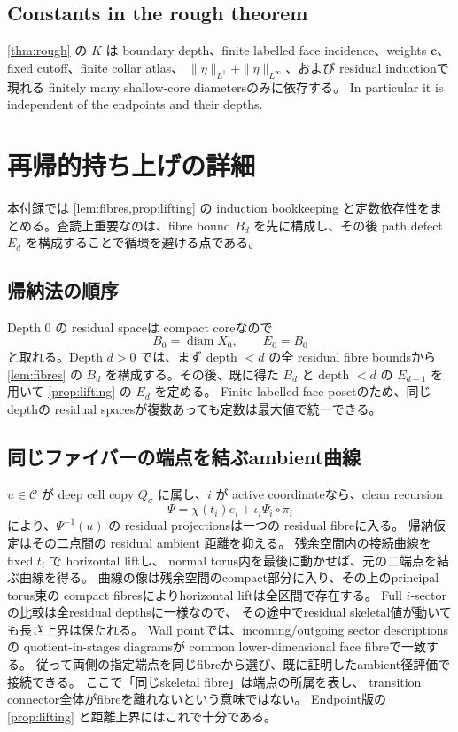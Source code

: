 \documentclass[11pt,a4paper]{ltjsarticle}
\newcommand{\diam}{\operatorname{diam}}
\newcommand{\cC}{\mathcal C}
\theoremstyle{plain}
\theoremstyle{definition}
\theoremstyle{remark}
\begin{document}
\subsection{Constants in the rough theorem}
\cref{thm:rough} の $K$ は boundary depth、finite labelled face incidence、weights $\bm c$、fixed cutoff、finite collar atlas、
$\|\eta\|_{L^1}+\|\eta\|_{L^\infty}$、および residual inductionで現れる finitely many shallow-core diametersのみに依存する。
In particular it is independent of the endpoints and their depths.

\section{再帰的持ち上げの詳細}
\label{app:lifting}
本付録では \cref{lem:fibres,prop:lifting} の induction bookkeeping と定数依存性をまとめる。査読上重要なのは、fibre bound $B_d$ を先に構成し、その後 path defect $E_d$ を構成することで循環を避ける点である。

\subsection{帰納法の順序}
Depth $0$ の residual spaceは compact coreなので
\[
 B_0=\diam X_0,
 \qquad E_0=B_0
\]
と取れる。Depth $d>0$ では、まず depth $<d$ の全 residual fibre boundsから \cref{lem:fibres} の $B_d$ を構成する。その後、既に得た $B_d$ と depth $<d$ の $E_{d-1}$ を用いて \cref{prop:lifting} の $E_d$ を定める。
Finite labelled face posetのため、同じ depthの residual spacesが複数あっても定数は最大値で統一できる。

\subsection{同じファイバーの端点を結ぶambient曲線}
$u\in\cC$ が deep cell copy $Q_\sigma$ に属し、$i$ が active coordinateなら、clean recursion
\[
 \Psi=\chi(t_i)e_i+\iota_i\Psi_i\circ\pi_i
\]
により、$\Psi^{-1}(u)$ の residual projectionsは一つの residual fibreに入る。
帰納仮定はその二点間の residual ambient 距離を抑える。
残余空間内の接続曲線を fixed $t_i$ で horizontal liftし、
normal torus内を最後に動かせば、元の二端点を結ぶ曲線を得る。
曲線の像は残余空間のcompact部分に入り、その上のprincipal torus束の
compact fibresによりhorizontal liftは全区間で存在する。
Full $i$-sectorの比較は全residual depthsに一様なので、
その途中でresidual skeletal値が動いても長さ上界は保たれる。
Wall pointでは、incoming/outgoing sector descriptionsの
quotient-in-stages diagramsが common lower-dimensional face fibreで一致する。
従って両側の指定端点を同じfibreから選び、既に証明したambient径評価で接続できる。
ここで「同じskeletal fibre」は端点の所属を表し、
transition connector全体がfibreを離れないという意味ではない。
Endpoint版の \cref{prop:lifting} と距離上界にはこれで十分である。
\end{document}
